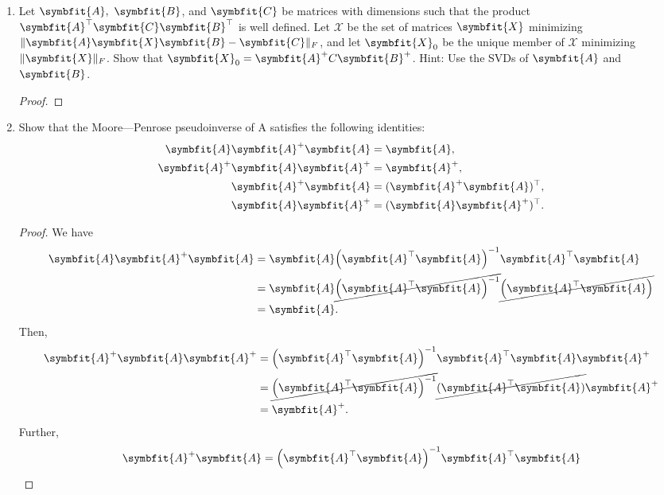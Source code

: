 \documentclass{article}
\theoremstyle{definition}
\newcommand{\mat}[1]{\symbfit{#1}}
\begin{document}
\begin{enumerate}[leftmargin=\labelsep]
	\item Let \(\mat{A},\ \mat{B}\), and \(\mat{C}\) be matrices with dimensions such that the product \(\mat{A}^\top\mat{C}\mat{B}^\top\) is well defined. Let \(\mathcal{X}\) be the set of matrices \(\mat{X}\) minimizing \(\|\mat{A}\mat{X} \mat{B} - \mat{C}\|_F\), and let \(\mat{X}_0\) be the unique member of \(\mathcal{X}\) minimizing \(\|\mat{X}\|_F\). Show that \(\mat{X}_0 = \mat{A}^+C\mat{B}^+\). Hint: Use the SVDs of \(\mat{A}\) and \(\mat{B}\).
	      \begin{proof}

	      \end{proof}

	\item Show that the Moore—Penrose pseudoinverse of A satisfies the following identities:
	      \begin{align*}
		      \mat{A}\mat{A}^+\mat{A}   & = \mat{A},                 \\
		      \mat{A}^+\mat{A}\mat{A}^+ & = \mat{A}^+,               \\
		      \mat{A}^+\mat{A}          & = (\mat{A}^+\mat{A})^\top, \\
		      \mat{A}\mat{A}^+          & = (\mat{A}\mat{A}^+)^\top.
	      \end{align*}
	      \begin{proof}
		      We have
		      \begin{align*}
			      \mat{A}\mat{A}^+\mat{A} & = \mat{A}\qty(\mat{A}^{\top}\mat{A})^{-1}\mat{A}^{\top}\mat{A}                          \\
			                              & = \mat{A}\cancel{\qty(\mat{A}^{\top}\mat{A})^{-1}}\cancel{\qty(\mat{A}^{\top}\mat{A}) } \\
			                              & = \mat{A}.
		      \end{align*}
		      Then,
		      \begin{align*}
			      \mat{A}^+\mat{A}\mat{A}^+ & = \qty(\mat{A}^{\top}\mat{A})^{-1}\mat{A}^{\top}\mat{A}\mat{A}^+                     \\
			                                & = \cancel{\qty(\mat{A}^{\top}\mat{A})^{-1}}\cancel{(\mat{A}^{\top}\mat{A})}\mat{A}^+ \\
			                                & = \mat{A}^+.
		      \end{align*}
		      Further,
		      \begin{align*}
			      \mat{A}^+\mat{A} & = \qty(\mat{A}^{\top}\mat{A})^{-1}\mat{A}^{\top}\mat{A}                          \\

\end{align*}
\end{proof}
\end{enumerate}
\end{document}
